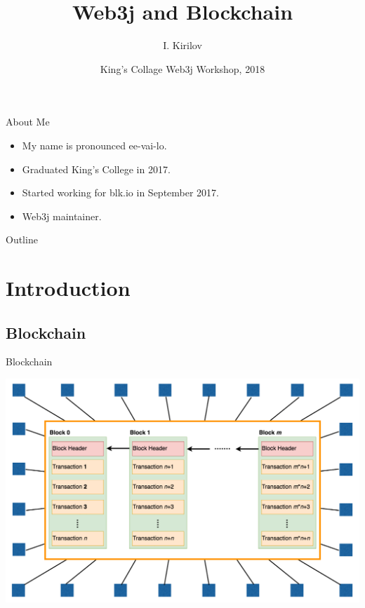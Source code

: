 \documentclass{beamer}
\title{Web3j and Blockchain}
\author{I. Kirilov}
\institute[] %
{
  Blockchain Platform Engineer\\
  Blk.io
}
\date{King's Collage Web3j Workshop, 2018}
\begin{document}
\begin{frame}
  \titlepage
\end{frame}

\begin{frame}{About Me}
	\begin{itemize}
		\item {
			My name is pronounced ee-vai-lo.
		}
		\item {
			Graduated King's College in 2017.
		}
		\item {
			Started working for blk.io in September 2017.
		}
		\item {
			Web3j maintainer.
		}
	\end{itemize}
\end{frame}

\begin{frame}{Outline}
  \tableofcontents
\end{frame}

\section{Introduction}

\subsection{Blockchain}

\begin{frame}{Blockchain}
	\begin{center}
		\includegraphics[width=1\linewidth]{Blockchain}
	\end{center}
\end{frame}
\end{document}

